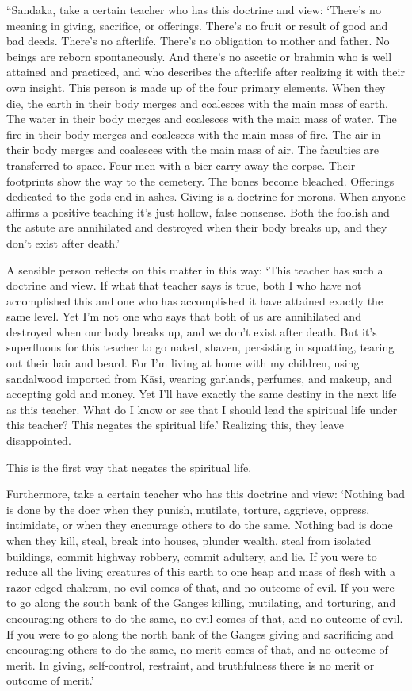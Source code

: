 \documentclass[12pt,openany]{book}%
\begin{document}
“Sandaka, take a certain teacher who has this doctrine and view: ‘There’s no meaning in giving, sacrifice, or offerings. There’s no fruit or result of good and bad deeds. There’s no afterlife. There’s no obligation to mother and father. No beings are reborn spontaneously. And there’s no ascetic or brahmin who is well attained and practiced, and who describes the afterlife after realizing it with their own insight. This person is made up of the four primary elements. When they die, the earth in their body merges and coalesces with the main mass of earth. The water in their body merges and coalesces with the main mass of water. The fire in their body merges and coalesces with the main mass of fire. The air in their body merges and coalesces with the main mass of air. The faculties are transferred to space. Four men with a bier carry away the corpse. Their footprints show the way to the cemetery. The bones become bleached. Offerings dedicated to the gods end in ashes. Giving is a doctrine for morons. When anyone affirms a positive teaching it’s just hollow, false nonsense. Both the foolish and the astute are annihilated and destroyed when their body breaks up, and they don’t exist after death.’ 

A sensible person reflects on this matter in this way: ‘This teacher has such a doctrine and view. If what that teacher says is true, both I who have not accomplished this and one who has accomplished it have attained exactly the same level. Yet I’m not one who says that both of us are annihilated and destroyed when our body breaks up, and we don’t exist after death. But it’s superfluous for this teacher to go naked, shaven, persisting in squatting, tearing out their hair and beard. For I’m living at home with my children, using sandalwood imported from \textsanskrit{Kāsi}, wearing garlands, perfumes, and makeup, and accepting gold and money. Yet I’ll have exactly the same destiny in the next life as this teacher. What do I know or see that I should lead the spiritual life under this teacher? This negates the spiritual life.’ Realizing this, they leave disappointed. 

This is the first way that negates the spiritual life. 

Furthermore, take a certain teacher who has this doctrine and view: ‘Nothing bad is done by the doer when they punish, mutilate, torture, aggrieve, oppress, intimidate, or when they encourage others to do the same. Nothing bad is done when they kill, steal, break into houses, plunder wealth, steal from isolated buildings, commit highway robbery, commit adultery, and lie. If you were to reduce all the living creatures of this earth to one heap and mass of flesh with a razor-edged chakram, no evil comes of that, and no outcome of evil. If you were to go along the south bank of the Ganges killing, mutilating, and torturing, and encouraging others to do the same, no evil comes of that, and no outcome of evil. If you were to go along the north bank of the Ganges giving and sacrificing and encouraging others to do the same, no merit comes of that, and no outcome of merit. In giving, self-control, restraint, and truthfulness there is no merit or outcome of merit.’ 
\end{document}
